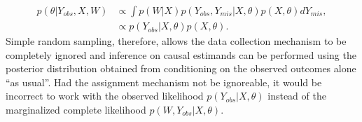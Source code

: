\documentclass[11pt]{article}
\begin{document}
\begin{align*}
  p(\theta|Y_{obs}, X, W) &\propto \int p(W|X) p(Y_{obs},Y_{mis}|X, \theta) p(X,\theta) dY_{mis},\\
  &\propto p(Y_{obs}|X,\theta)p(X,\theta).
\end{align*}
Simple random sampling, therefore, allows the data collection mechanism to be completely ignored and inference on causal estimands can be performed using the posterior distribution obtained from conditioning on the observed outcomes alone ``as usual''. Had the assignment mechanism not be ignoreable, it would be incorrect to work with the observed likelihood $p(Y_{obs}|X,\theta)$ instead of the marginalized complete likelihood $p(W, Y_{obs}|X,\theta)$.

\end{document}
